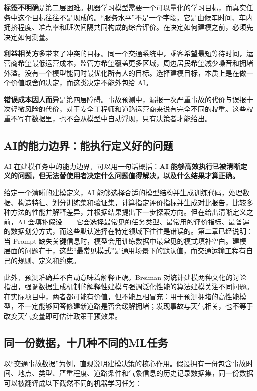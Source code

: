 \textbf{标签不明确}是第二层困难。机器学习模型需要一个可以量化的学习目标，而真实任务中这个目标往往不是现成的。“服务水平”不是一个字段，它是由候车时间、车内拥挤程度、准点率和班次间隔共同构成的综合评价。在决定如何建模之前，必须先决定如何测量。

\textbf{利益相关方多}带来了冲突的目标。同一个交通系统中，乘客希望最短等待时间，运营商希望最低运营成本，监管方希望覆盖更多区域，周边居民希望减少噪音和拥堵外溢。没有一个模型能同时最优化所有人的目标。选择建模目标，本质上是在做一个价值取舍的决定，而这类决定不能外包给 AI。

\textbf{错误成本因人而异}是第四层障碍。事故预测中，漏报一次严重事故的代价与误报十次轻微风险的代价，对于安全工程师和道路运营商来说有完全不同的权重。这些权重不写在数据里，也不会从模型中自动浮现，只有决策者才能给出。

\subsection{AI的能力边界：能执行定义好的问题}

AI 在建模任务中的能力边界，可以用一句话概括：\textbf{AI 能够高效执行已被清晰定义的问题，但无法替使用者决定什么问题值得解决，以及什么结果才算正确。}

给定一个清晰的建模定义，AI 能够选择合适的模型结构并生成训练代码，处理数据、构造特征、划分训练集和验证集，计算指定评价指标并生成对比报告，比较多种方法的性能并解释差异，并根据结果提出下一步探索方向。但在给出清晰定义之前，AI 会填补假设——它会选择最常见的任务类型、最常用的评价指标、最普遍的数据划分方式，而这些默认选择在特定领域下往往是错误的。第二章已经说明：当 Prompt 缺失关键信息时，模型会用训练数据中最常见的模式填补空白。建模层面的问题在于，这些“最常见模式”是通用场景下的默认值，而交通运输工程有自己的规则、定义和约束。

此外，预测准确并不自动意味着解释正确。Breiman 对统计建模两种文化的讨论指出，强调数据生成机制的解释性建模与强调泛化性能的算法建模关注不同问题\cite{breiman2001statistical}。在实际项目中，两者都可能有价值，但不能互相冒充：用于预测拥堵的高性能模型，不一定能够回答修建新道路是否会缓解拥堵；发现事故与天气相关，也不等于改变天气变量即可估计政策干预效果。

\subsection{同一份数据，十几种不同的ML任务}

以“交通事故数据”为例，直观说明建模决策的核心作用。假设拥有一份包含事故时间、地点、类型、严重程度、道路条件和气象信息的历史记录数据集，同一份数据可以被翻译成以下截然不同的机器学习任务：

